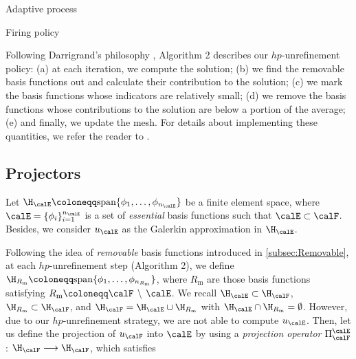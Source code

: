 %

\begin{algorithm}
  \SetAlgoLined

  \caption{Adaptive process}
\end{algorithm}

\begin{algorithm}
  \SetAlgoLined

  \caption{Firing policy}
\end{algorithm}

Following Darrigrand's philosophy \cite{darrigrand2020painless}, Algorithm 2 describes our $hp$-unrefinement policy: (a) at each iteration, we compute the solution; (b) we find the removable basis functions out and calculate their contribution to the solution; (c) we mark the basis functions whose indicators are relatively small; (d) we remove the basis functions whose contributions to the solution are below a portion of the average; (e) and finally, we update the mesh. For details about implementing these quantities, we refer the reader to \cite{darrigrand2020painless}.

\subsection{Projectors}
Let $ \H_{\calE}  \coloneqq \textrm{span}\{\phi_{1}, \dots, \phi_{n_{\calE}}\}$ be a finite element space, where $\calE = \{ \phi_{i} \}_{i=1}^{n_{\calE}}$ is a set of  \emph{essential} basis functions such that $\calE \subset \calF$. Besides, we consider $u_{\calE}$ as the Galerkin approximation in $\H_{\calE}$.

Following the idea of \emph{removable} basis functions introduced in \cref{subsec:Removable}, at each $hp$-unrefinement step (Algorithm 2), we define $\H_{R_{\textrm{m}}} \coloneqq \textrm{span}\{\phi_{1}, \dots, \phi_{n_{R_{\textrm{m}}}}\}$, where $R_{\textrm{m}}$ are those basis functions satisfying $R_{\textrm{m}} \coloneqq \calF \, \setminus \, \calE$. We recall $\H_{\calE} \subset \H_{\calF}$, $\H_{R_{\textrm{m}}} \subset \H_{\calF}$, and $\H_{\calF} = \H_{\calE} \cup \H_{R_{\textrm{m}}}$ with $\H_{\calE}\cap \H_{R_{\textrm{m}}} = \emptyset$. However, due to our $hp$-unrefinement strategy, we are not able to compute $u_{\calE}$. Then, let us define the projection of $u_{\calF}$ into $\calE$ by using a \emph{projection operator} $\Pi_{\calF}^{\calE}$: $\H _{\calF} \longrightarrow \H_{\calF}$, which satisfies

